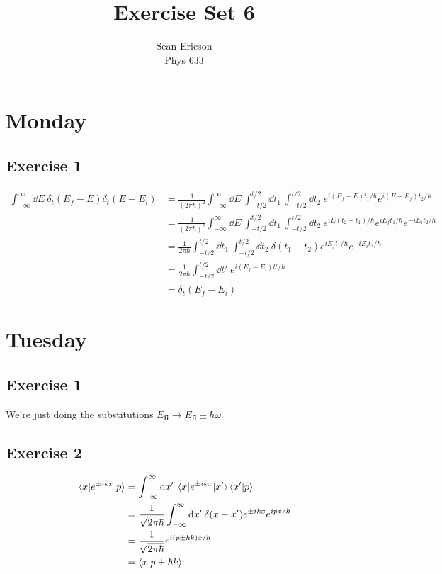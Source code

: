 \documentclass[12pt]{article}
\newcommand{\fullint}{\int_{-\infty}^\infty}
\newcommand{\fullintd}[1]{\fullint\dd#1\:}
\newcommand{\cint}[2]{\int_{#1}^{#2}}
\newcommand{\cintd}[3]{\cint{#1}{#2}\dd#3\:}
\begin{document}
	
\title{Exercise Set 6}
\author{Sean Ericson \\ Phys 633}
\maketitle

\section*{Monday}
\subsection*{Exercise 1}
\begin{align*}
  \fullintd{E} \delta_t(E_f-E)\delta_t(E-E_i) &= \frac{1}{(2\pi\hbar)^2}\fullintd{E}\cintd{-t/2}{t/2}{t_1}\cintd{-t/2}{t/2}{t_2}e^{i(E_f-E)t_1/\hbar}e^{i(E-E_f)t_2/\hbar} \\
  &= \frac{1}{(2\pi\hbar)^2}\fullintd{E}\cintd{-t/2}{t/2}{t_1}\cintd{-t/2}{t/2}{t_2} e^{iE(t_2-t_1)/\hbar}e^{iE_ft_1/\hbar}e^{-iE_it_2/\hbar} \\
  &= \frac{1}{2\pi\hbar} \cintd{-t/2}{t/2}{t_1}\cintd{-t/2}{t/2}{t_2} \delta(t_1-t_2)e^{iE_ft_1/\hbar}e^{-iE_it_2/\hbar} \\
  &= \frac{1}{2\pi\hbar} \cintd{-t/2}{t/2}{t'}e^{i(E_f-E_i)t'/\hbar} \\
  &= \delta_t(E_f-E_i)
\end{align*}


\section*{Tuesday}
\subsection*{Exercise 1}
We're just doing the substitutions $E_\textbf{fi} \to E_\textbf{fi} \pm \hbar\omega$

\subsection*{Exercise 2}
\begin{align*}
  \mel{x}{e^{\pm ikx}}{p} &= \fullintd{x'}\mel{x}{e^{\pm ikx}}{x'}\braket{x'}{p} \\
  &= \frac{1}{\sqrt{2\pi\hbar}}\fullintd{x'}\delta(x-x')e^{\pm ikx}e^{ipx/\hbar} \\
  &= \frac{1}{\sqrt{2\pi\hbar}}e^{i (p \pm \hbar k)x/\hbar} \\
  &= \braket{x}{p \pm \hbar k}
\end{align*}
\end{document}

